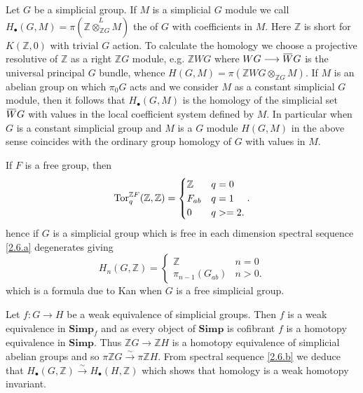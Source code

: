 \documentclass[../main]{subfiles}
\begin{document}
 Let $G$ be a simplicial group. If $M$ is a simplicial $G$ module we call $H_{\bullet } (G, M) = \pi (\mathbb{Z} \overset{L}{\otimes_{\mathbb{Z}G}} M )$ the  of $G$ with coefficients in $M$. Here $\mathbb{Z}$ is short for $K(\mathbb{Z}, 0)$ with trivial $G$ action. To calculate the homology we choose a projective resolutive of $\mathbb{Z}$ as a right $\mathbb{Z} G$ module, e.g. $\mathbb{Z} W G$ where $WG \longrightarrow  \xoverline{W} G$ is the universal principal $G$ bundle, whence $H(G, M) = \pi (\mathbb{Z} WG \otimes_{\mathbb{Z}G} M)$. If $M$ is an abelian group on which $\pi_0 G$ acts and we consider $M$ as a constant simplicial $G$ module, then it follows that $H_{\bullet }(G, M)$ is the homology of the simplicial set $\xoverline{W} G$ with values in the local coefficient system defined by $M$. In particular when $G$ is a constant simplicial group and $M$ is a $G$ module $H(G,M)$ in the above sense coincides with the ordinary group homology of $G$ with values in $M$.

If $F$ is a free group, then 
\[ 
\operatorname{Tor}_q^{\mathbb{Z}F} (\mathbb{Z}, \mathbb{Z}) = 
\begin{cases}
\mathbb{Z} & q = 0\\
F_{ab} & q = 1\\
0 & q>=2 
.\end{cases}
.\]
hence if $G$ is a simplicial group which is free in each dimension spectral sequence \ref{2.6.a} degenerates giving 
\begin{equation}\label{eq:2.6.16}\tag{16}
H_n (G, \mathbb{Z}) = \begin{cases}
\mathbb{Z} & n=0\\
\pi_{n-1} (G_{ab}) & n > 0
.\end{cases}
\end{equation}
which is a formula due to Kan \cite{kan_homotopy_1958} when $G$ is a free simplicial group.

Let $f \colon G \longrightarrow  H$ be a weak equivalence of simplicial groups. Then $f$ is a weak equivalence in $\mathbf{Simp}_f$ and as every object of $\mathbf{Simp}$ is cofibrant $f$ is a homotopy equivalence in $\mathbf{Simp}$. Thus $\mathbb{Z}G \longrightarrow  \mathbb{Z}H$ is a homotopy equivalence of simplicial abelian groups and so $\pi \mathbb{Z}G \overset{\sim}{\to}\pi \mathbb{Z}H$. From spectral sequence \ref{2.6.b} we deduce that $H_{\bullet } (G, \mathbb{Z}) \overset{\sim}{\to}H_{\bullet } (H, \mathbb{Z})$ which shows that homology is a weak homotopy invariant. 
\end{document}
